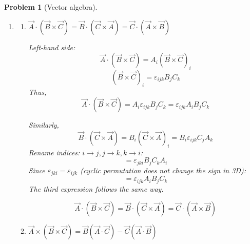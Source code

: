 \documentclass{article}
\theoremstyle{1}
\newtheorem{problem}{Problem}
\begin{document}
\begin{problem}[Vector algebra]
    \quad
    \begin{enumerate}[label=\arabic*.]
        \item 

    \begin{enumerate}
\item \(\vec{A} \cdot (\vec{B} \times \vec{C}) = \vec{B} \cdot (\vec{C} \times \vec{A}) = \vec{C} \cdot (\vec{A} \times \vec{B})\)

Left-hand side:
\begin{equation}
\vec{A} \cdot (\vec{B} \times \vec{C}) = A_i (\vec{B} \times \vec{C})_i
\end{equation}
\begin{equation}
(\vec{B} \times \vec{C})_i = \varepsilon_{ijk} B_j C_k
\end{equation}
Thus,
\begin{equation}
\vec{A} \cdot (\vec{B} \times \vec{C}) = A_i \varepsilon_{ijk} B_j C_k = \varepsilon_{ijk} A_i B_j C_k
\end{equation}

Similarly,
\begin{equation}
\vec{B} \cdot (\vec{C} \times \vec{A}) = B_i (\vec{C} \times \vec{A})_i = B_i \varepsilon_{ijk} C_j A_k
\end{equation}
Rename indices: \(i \to j, j \to k, k \to i\):
\begin{equation}
= \varepsilon_{jki} B_j C_k A_i
\end{equation}
Since \(\varepsilon_{jki} = \varepsilon_{ijk}\) (cyclic permutation does not change the sign in 3D):
\begin{equation}
= \varepsilon_{ijk} A_i B_j C_k
\end{equation}
The third expression follows the same way.

\begin{equation}
\boxed{\vec{A} \cdot (\vec{B} \times \vec{C}) = \vec{B} \cdot (\vec{C} \times \vec{A}) = \vec{C} \cdot (\vec{A} \times \vec{B})}
\end{equation}

\item \(\vec{A} \times (\vec{B} \times \vec{C}) = \vec{B}(\vec{A} \cdot \vec{C}) - \vec{C}(\vec{A} \cdot \vec{B})\)


\end{enumerate}
\end{enumerate}
\end{problem}
\end{document}
